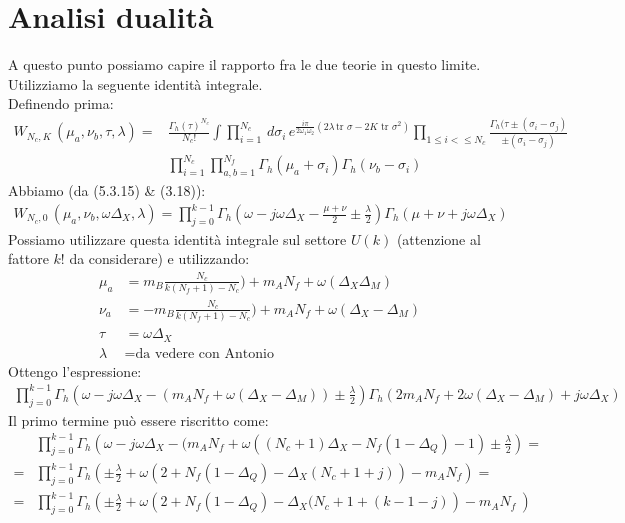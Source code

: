 \documentclass[a4paper,12pt]{article}
\begin{document}
\section{Analisi dualità}
A questo punto possiamo capire il rapporto fra le due teorie in questo limite.
Utilizziamo la seguente identità integrale.\\
Definendo prima:
\begin{align*}
W_{N_c , K } \, ( \mu_a, \nu_b , \tau, \lambda ) = & \frac{\Gamma_h (\tau)^{N_c}}{N_c !}
\int \prod_{i=1}^{N_c} \, d \sigma_i \, e^{ \frac{i \pi}{2 \omega_1 \omega_2} \left( 2 \lambda
\, \mbox{tr } \sigma - 2 K \mbox{ tr } \sigma^2 \right)} \prod_{1 \leq i < \leq N_c}
\frac{ \Gamma_h ( \tau \pm ( \sigma_i - \sigma_j) }{ \pm (\sigma_i - \sigma_j) } \\
&  \prod_{i=1}^{N_c} \prod_{a,b=1}^{N_f} \Gamma_h ( \mu_a + \sigma_i) \Gamma_h(\nu_b- \sigma_i)
\end{align*} 
Abbiamo (da \citep{vanDeBult:2007}(5.3.15) \& \citep{Amariti:2014iza}(3.18)):
\begin{align*}
W_{N_c , 0 } \, ( \mu_a, \nu_b , \omega \Delta_X, \lambda )  = \prod_{j=0}^{k-1} \Gamma_h \left( \omega  - j \omega \Delta_X  - \frac{\mu+\nu}{2} \pm \frac{\lambda}{2} \right) 
\Gamma_h \left( \mu + \nu + j \omega \Delta_X \right)
\end{align*}
Possiamo utilizzare questa identità integrale sul settore $ U(k)$ (attenzione al fattore $k!$ da considerare) e utilizzando:
\begin{align*}
	\mu_a & = m_B \frac{N_c}{k(N_f+1)-N_c})+ m_A N_f + \omega( \Delta_X \Delta_M ) \\
	\nu_a  &= -m_B \frac{N_c}{k(N_f+1)-N_c})+ m_A N_f + \omega( \Delta_X -\Delta_M )\\
	\tau  & =  \omega \Delta_X  \\
	\lambda & = \mbox{da vedere con Antonio}
\end{align*}
Ottengo l'espressione:
\begin{align*}
\prod_{j=0}^{k-1} \Gamma_h \left( \omega - j \omega \Delta_X - ( m_A N_f + \omega(\Delta_X - \Delta_M)) \pm \frac{\lambda}{2} \right) \Gamma_h \left( 2 m_A N_f + 2 \omega(\Delta_X - \Delta_M) + j \omega \Delta_X \right) 
\end{align*}
Il primo termine può essere riscritto come:
\begin{align*}
& \prod_{j=0}^{k-1} \Gamma_h \left( \omega - j \omega \Delta_X - ( m_A N_f + \omega( (N_c+1) \Delta_X - N_f (1 - \Delta_Q ) - 1) \pm \frac{\lambda}{2} \right) = \\
= & \prod_{j=0}^{k-1} \Gamma_h \left( \pm \frac{\lambda}{2} +\omega \left( 
 2 + N_f ( 1 - \Delta_Q ) - \Delta_X ( N_c +1 + j)  \right) - m_A N_f 
 \right) = \\
 = & \prod_{j=0}^{k-1} \Gamma_h \left( \pm \frac{\lambda}{2} +\omega \left( 
 2 + N_f ( 1 - \Delta_Q ) - \Delta_X ( N_c +1 + (k-1 - j)  \right) - m_A N_f \
 \right)
\end{align*}
\end{document}
